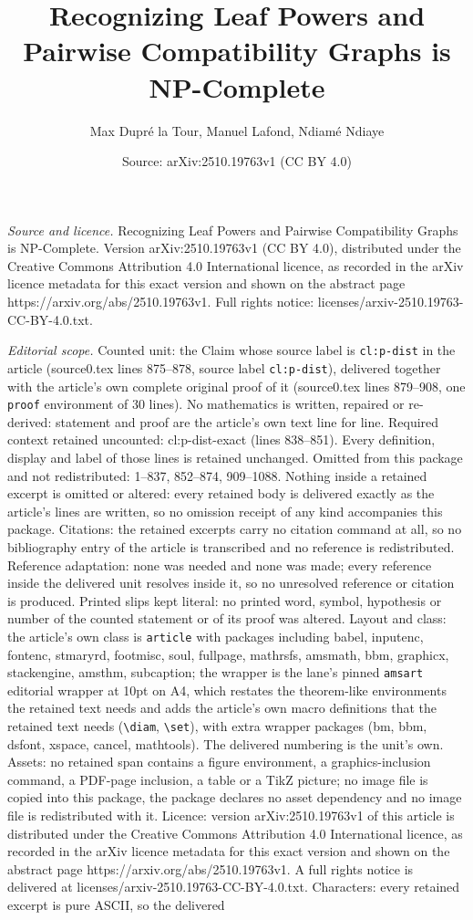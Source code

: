 \documentclass[10pt,a4paper]{amsart}
\title[Recognizing Leaf Powers and Pairwise Compatibility Graphs is]{Recognizing Leaf Powers and Pairwise Compatibility Graphs is NP-Complete}
\author{Max Dupr\'e la Tour, Manuel Lafond, Ndiam\'e Ndiaye}
\date{Source: arXiv:2510.19763v1 (CC BY 4.0)}
\begin{document}
\maketitle

\noindent\emph{Source and licence.} Recognizing Leaf Powers and Pairwise Compatibility Graphs is NP-Complete. Version arXiv:2510.19763v1 (CC BY 4.0), distributed under the Creative Commons Attribution 4.0 International licence, as recorded in the arXiv licence metadata for this exact version and shown on the abstract page https://arxiv.org/abs/2510.19763v1. Full rights notice: licenses/arxiv-2510.19763-CC-BY-4.0.txt.\par\smallskip

\noindent\textit{Editorial scope.} Counted unit: the Claim whose source label is \texttt{cl:p-dist} in the article (source0.tex lines 875--878, source label \texttt{cl:p-dist}), delivered together with the article's own complete original proof of it (source0.tex lines 879--908, one \texttt{proof} environment of 30 lines). No mathematics is written, repaired or re-derived: statement and proof are the article's own text line for line. Required context retained uncounted: cl:p-dist-exact (lines 838--851). Every definition, display and label of those lines is retained unchanged. Omitted from this package and not redistributed: 1--837, 852--874, 909--1088. Nothing inside a retained excerpt is omitted or altered: every retained body is delivered exactly as the article's lines are written, so no omission receipt of any kind accompanies this package. Citations: the retained excerpts carry no citation command at all, so no bibliography entry of the article is transcribed and no reference is redistributed. Reference adaptation: none was needed and none was made; every reference inside the delivered unit resolves inside it, so no unresolved reference or citation is produced. Printed slips kept literal: no printed word, symbol, hypothesis or number of the counted statement or of its proof was altered. Layout and class: the article's own class is \texttt{article} with packages including babel, inputenc, fontenc, stmaryrd, footmisc, soul, fullpage, mathrsfs, amsmath, bbm, graphicx, stackengine, amsthm, subcaption; the wrapper is the lane's pinned \texttt{amsart} editorial wrapper at 10pt on A4, which restates the theorem-like environments the retained text needs and adds the article's own macro definitions that the retained text needs (\texttt{\textbackslash diam}, \texttt{\textbackslash set}), with extra wrapper packages (bm, bbm, dsfont, xspace, cancel, mathtools). The delivered numbering is the unit's own. Assets: no retained span contains a figure environment, a graphics-inclusion command, a PDF-page inclusion, a table or a TikZ picture; no image file is copied into this package, the package declares no asset dependency and no image file is redistributed with it. Licence: version arXiv:2510.19763v1 of this article is distributed under the Creative Commons Attribution 4.0 International licence, as recorded in the arXiv licence metadata for this exact version and shown on the abstract page https://arxiv.org/abs/2510.19763v1. A full rights notice is delivered at licenses/arxiv-2510.19763-CC-BY-4.0.txt. Characters: every retained excerpt is pure ASCII, so the delivered 
\end{document}
